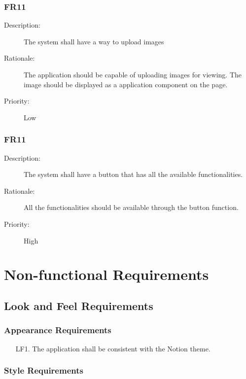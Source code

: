 \documentclass[12pt, titlepage]{article}
\begin{document}
\subsubsection{FR11}

\begin{description}
  \item[Description:] The system shall have a way to upload images
  \item[Rationale:] The application should be capable of uploading images for viewing. The image should be displayed as a application component on the page.
  \item[Priority:] Low
\end{description}

\subsubsection{FR11}

\begin{description}
  \item[Description:] The system shall have a button that has all the available functionalities.
  \item[Rationale:] All the functionalities should be available through the button function.
  \item[Priority:] High
\end{description}


\section{Non-functional Requirements}

\subsection{Look and Feel Requirements}

\subsubsection{Appearance Requirements}

\begin{itemize}
  \item[LF1.] The application shall be consistent with the Notion theme. 
\end{itemize}

\subsubsection{Style Requirements}
\end{document}
